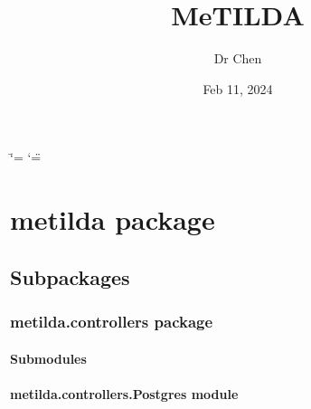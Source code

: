 \documentclass[letterpaper,10pt,english]{sphinxmanual}
\title{MeTILDA}
\date{Feb 11, 2024}
\author{Dr Chen}
\begin{document}
\ifdefined\shorthandoff
  \ifnum\catcode`\=\string=\active\shorthandoff{=}\fi
  \ifnum\catcode`\"=\active{}\fi
\fi

\pagestyle{empty}
\sphinxmaketitle
\pagestyle{plain}
\sphinxtableofcontents
\pagestyle{normal}
\label{\detokenize{index::doc}}



\chapter{metilda package}
\label{\detokenize{index:metilda-package}}

\section{Subpackages}
\label{\detokenize{index:subpackages}}
\sphinxstepscope


\subsection{metilda.controllers package}
\label{\detokenize{metilda.controllers:metilda-controllers-package}}\label{\detokenize{metilda.controllers::doc}}

\subsubsection{Submodules}
\label{\detokenize{metilda.controllers:submodules}}

\subsubsection{metilda.controllers.Postgres module}
\label{\detokenize{metilda.controllers:module-metilda.controllers.Postgres}}\label{\detokenize{metilda.controllers:metilda-controllers-postgres-module}}
\end{document}
